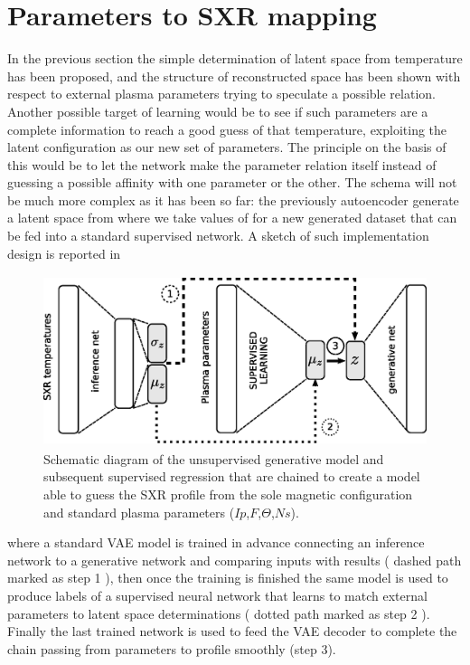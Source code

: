 \section{Parameters to SXR mapping}
\label{section:Parameters_to_SXR}

In the previous section the simple determination of latent space from temperature has been proposed, and the structure of reconstructed space has been shown with respect to external plasma parameters trying to speculate a possible relation.
Another possible target of learning would be to see if such parameters are a complete information to reach a good guess of that temperature, exploiting the latent configuration as our new set of parameters.
The principle on the basis of this would be to let the network make the parameter relation itself instead of guessing a possible affinity with one parameter or the other.
The schema will not be much more complex as it has been so far: the previously autoencoder generate a latent space from where we take values of for a new generated dataset that can be fed into a standard supervised network. 
A sketch of such implementation design is reported in~\Figure{\ref{fig:SXR_from_param}}
\begin{figure}
    \centering
    \includegraphics[height=5cm]{img/STEP12_7/SXR_from_PARAMS.eps}
    \caption{Schematic diagram of the unsupervised generative model and subsequent supervised regression that are chained to create a model able to guess the SXR profile from the sole magnetic configuration and standard plasma parameters ($Ip$,$F$,$\Theta$,$Ns$). }
    \label{fig:SXR_from_param}
\end{figure}
where a standard \acs{VAE} model is trained in advance connecting an inference network to a generative network and comparing inputs with results ( dashed path marked as step 1 ), then once the training is finished the same model is used to produce labels of a supervised neural network that learns to match external parameters to latent space determinations ( dotted path marked as step 2 ). Finally the last trained network is used to feed the \acs{VAE} decoder to complete the chain passing from parameters to profile smoothly (step 3).

